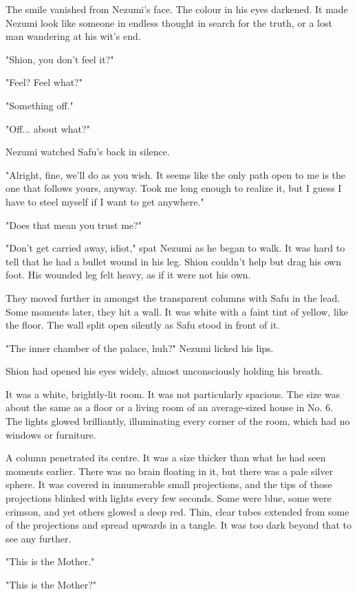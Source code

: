 The smile vanished from Nezumi's face. The colour in his eyes darkened.
It made Nezumi look like someone in endless thought in search for the
truth, or a lost man wandering at his wit's end.

"Shion, you don't feel it?"

"Feel? Feel what?"

"Something off."

"Off... about what?"

Nezumi watched Safu's back in silence.

"Alright, fine, we'll do as you wish. It seems like the only path open
to me is the one that follows yours, anyway. Took me long enough to
realize it, but I guess I have to steel myself if I want to get
anywhere."

"Does that mean you trust me?"

"Don't get carried away, idiot," spat Nezumi as he began to walk. It was
hard to tell that he had a bullet wound in his leg. Shion couldn't help
but drag his own foot. His wounded leg felt heavy, as if it were not his
own.

They moved further in amongst the transparent columns with Safu in the
lead. Some moments later, they hit a wall. It was white with a faint
tint of yellow, like the floor. The wall split open silently as Safu
stood in front of it.

"The inner chamber of the palace, huh?" Nezumi licked his lips.

Shion had opened his eyes widely, almost unconsciously holding his
breath.

It was a white, brightly-lit room. It was not particularly spacious. The
size was about the same as a floor or a living room of an average-sized
house in No. 6. The lights glowed brilliantly, illuminating every corner
of the room, which had no windows or furniture.

A column penetrated its centre. It was a size thicker than what he had
seen moments earlier. There was no brain floating in it, but there was a
pale silver sphere. It was covered in innumerable small projections, and
the tips of those projections blinked with lights every few seconds.
Some were blue, some were crimson, and yet others glowed a deep red.
Thin, clear tubes extended from some of the projections and spread
upwards in a tangle. It was too dark beyond that to see any further.

"This is the Mother."

"This is the Mother?"

